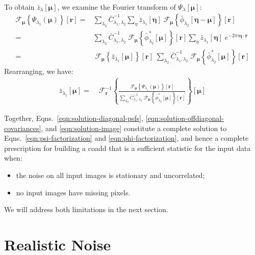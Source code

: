 \documentclass[DM,authoryear,toc]{lsstdoc}
\begin{document}
To obtain $\bar{z}_{\lambda}[\bm{\mu}]$, we examine the Fourier transform of $\Psi_{\lambda}[\bm{\mu}]$:
\begin{align}
    \mathcal{F}_{\bm{\mu}}\!\left\{
        \Psi_{\lambda_1}(\bm{\mu})
    \right\}\!\left[
        \bm{r}
    \right]
    = &
        \sum_{\lambda_2}
        \bar{C}_{\lambda_1,\lambda_2}^{-1}
        \sum_{\eta}
        \bar{z}_{\lambda_1}[\bm{\eta}]
        \;
        \mathcal{F}_{\bm{\mu}}\!\left\{
            \bar{\phi}_{\lambda_2}[\bm{\eta}-\bm{\mu}]
        \right\}\!\left[
            \bm{r}
        \right]
    \\
    = &
        \sum_{\lambda_2}
        \bar{C}_{\lambda_1,\lambda_2}^{-1}
        \;
        \mathcal{F}_{\bm{\mu}}\!\left\{
            \bar{\phi}^*_{\lambda_2}[\bm{\mu}]
        \right\}\!\left[
            \bm{r}
        \right]
        \sum_{\eta}
        \bar{z}_{\lambda_1}[\bm{\eta}]
        \;
        e^{-2\pi i \bm{\eta}\cdot\bm{r}}
    \\
    = & \;
        \mathcal{F}_{\bm{\mu}}\!\left\{
            \bar{z}_{\lambda_1}[\bm{\mu}]
        \right\}\!\left[
            \bm{r}
        \right]
        \;
        \sum_{\lambda_2}
        \bar{C}_{\lambda_1,\lambda_2}^{-1}
        \;
        \mathcal{F}_{\bm{\mu}}\!\left\{
            \bar{\phi}^*_{\lambda_2}[\bm{\mu}]
        \right\}\!\left[
            \bm{r}
        \right]
\end{align}
Rearranging, we have:
\begin{align}
    \bar{z}_{\lambda_1}[\bm{\mu}]
    =&\;
    \mathcal{F}^{-1}_{\bm{r}}\!\left\{
        \frac{
            \mathcal{F}_{\bm{\mu}}\!\left\{
                \Psi_{\lambda_1}(\bm{\mu})
            \right\}\!\left[
                \bm{r}
            \right]
        }{
            \sum\limits_{\lambda_2}
            \bar{C}_{\lambda_1,\lambda_2}^{-1}
            \;
            \mathcal{F}_{\bm{\mu}}\!\left\{
                \bar{\phi}^*_{\lambda_2}[\bm{\mu}]
            \right\}\!\left[
                \bm{r}
            \right]
        }
        \right\}\!\left[
        \bm{\mu}
    \right]
    \label{eqn:solution-image}
\end{align}

Together, Eqns.~\ref{eqn:solution-diagonal-psfs}, \ref{eqn:solution-offdiagonal-covariances}, and \ref{eqn:solution-image} constitute a complete solution to Eqns.~\ref{eqn:psi-factorization} and \ref{eqn:phi-factorization}, and hence a complete prescription for building a coadd that is a sufficient statistic for the input data when:
\begin{itemize}
    \item the noise on all input images is stationary and uncorrelated;
    \item no input images have missing pixels.
\end{itemize}
We will address both limitations in the next section.

\section{Realistic Noise}


\end{document}
